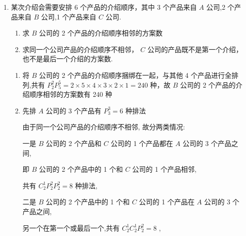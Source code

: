 \begin{enumerate}
\begin{enumerate}
\begin{jieda}
\begin{enumerate}
                \item 先排其余的 3 道工序，有 $P_{3}^{3} = 6$ 种不同的排法，有 4 个空档，再将这 3 道工序插入空档，有 $P_{4}^{3} = {24}$ 种不同的排法，由分步乘法计数原理可得，共有 $6 \times  {24} = {144}$ 种加工顺序.
            \end{enumerate}
        \end{jieda}
        \item 某次介绍会需要安排 6 个产品的介绍顺序，其中 3 个产品来自 $A$ 公司,2 个产品来自 $B$ 公司,1 个产品来自 $C$ 公司.
        \begin{enumerate}
            \item 求 $B$ 公司的 2 个产品的介绍顺序相邻的方案数
            \item 求同一个公司产品的介绍顺序不相邻， $C$ 公司的产品既不是第一个介绍，也不是最后一个介绍的方案数.
        \end{enumerate}
        \begin{jieda}
            \begin{enumerate}
                \item 将 $B$ 公司的 2 个产品的介绍顺序捆绑在一起，与其他 4 个产品进行全排列,共有 $P_{2}^{2}P_{5}^{5} = 2 \times  5 \times  4 \times  3 \times  2 \times  1 = {240}$ 种，故 $B$ 公司的 2 个产品的介绍顺序相邻的方案数有 240 种
                \item 先排 $A$ 公司的 3 个产品有 $P_{3}^{3} = 6$ 种排法
                
                由于同一个公司产品的介绍顺序不相邻, 故分两类情况:
                
                一是 $B$ 公司的 2 个产品和 $C$ 公司的 1 个产品都在 $A$ 公司的 3 个产品之间,
                
                即 $B$ 公司的 2 个产品中的 1 个和 $C$ 公司的 1 个产品相邻,
                
                共有 ${{C}}_{2}^{1}P_{2}^{2}P_{2}^{2} = 8$ 种排法,
                
                二是 $B$ 公司的 2 个产品中的 1 个和 $C$ 公司的 1 个产品在 $A$ 公司的 3 个产品之间,
                
                另一个在第一个或最后一个,共有 ${{C}}_{2}^1{{C}}_{2}^1P_{2}^{2} = 8$ ,
                

\end{enumerate}
\end{jieda}
\end{enumerate}
\end{enumerate}
